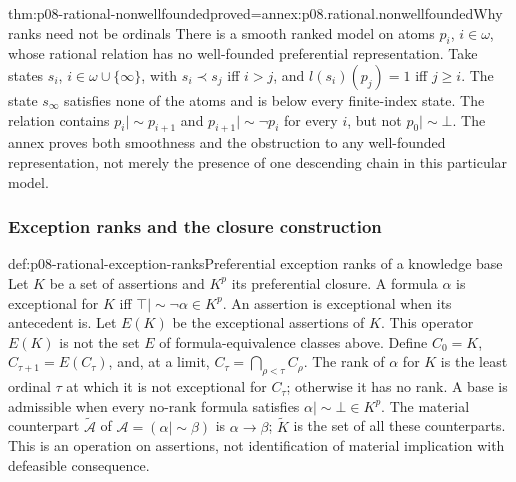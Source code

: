 \begin{hbtheorem}{thm:p08-rational-nonwellfounded}{proved=annex:p08.rational.nonwellfounded}{Why ranks need not be ordinals}
There is a smooth ranked model on atoms \(p_i\), \(i\in\omega\),
whose rational relation has no well-founded preferential representation.
Take states \(s_i\), \(i\in\omega\cup\{\infty\}\), with
\(s_i\prec s_j\) iff \(i>j\), and
\(l(s_i)(p_j)=1\) iff \(j\geq i\).
The state \(s_\infty\) satisfies none of the atoms and is below
every finite-index state. The relation contains
\(p_i\mathrel{|\!\sim}p_{i+1}\) and
\(p_{i+1}\mathrel{|\!\sim}\neg p_i\) for every \(i\),
but not \(p_0\mathrel{|\!\sim}\bot\).
The annex proves both smoothness and the obstruction to any
well-founded representation, not merely the presence of one descending
chain in this particular model.
\end{hbtheorem}

\subsubsection{Exception ranks and the closure construction}

\begin{hbdefinition}{def:p08-rational-exception-ranks}{Preferential exception ranks of a knowledge base}
Let \(K\) be a set of assertions and \(K^p\) its preferential
closure. A formula \(\alpha\) is exceptional for \(K\) iff
\(\top\mathrel{|\!\sim}\neg\alpha\in K^p\).
An assertion is exceptional when its antecedent is. Let \(E(K)\)
be the exceptional assertions of \(K\). This operator \(E(K)\)
is not the set \(E\) of formula-equivalence classes above.
Define \(C_0=K\), \(C_{\tau+1}=E(C_\tau)\), and, at a limit,
\(C_\tau=\bigcap_{\rho<\tau}C_\rho\).
The rank of \(\alpha\) for \(K\) is the least ordinal \(\tau\)
at which it is not exceptional for \(C_\tau\); otherwise it has
no rank. A base is admissible when every no-rank formula satisfies
\(\alpha\mathrel{|\!\sim}\bot\in K^p\).
The material counterpart \(\widetilde{\mathcal A}\) of
\(\mathcal A=(\alpha\mathrel{|\!\sim}\beta)\) is
\(\alpha\to\beta\); \(\widetilde K\) is the set of all these
counterparts. This is an operation on assertions, not identification
of material implication with defeasible consequence.
\end{hbdefinition}

